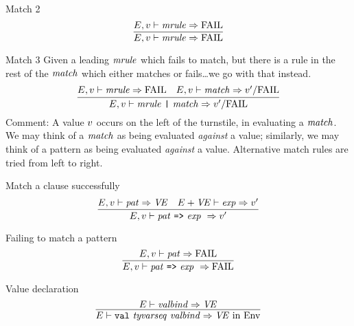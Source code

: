 \begin{inference-rule}{Match 2}
\begin{equation}\label{rule:dynamic-core:match2}
\vcenter{\infer{\E,\V\ts\mrule\ra\FAIL}{\E,\V\ts\mrule\ra\FAIL}}
\end{equation}
\end{inference-rule}

\begin{inference-rule}{Match 3}
Given a leading $\textit{mrule\/}$ which fails to match, but there is a rule in
the rest of the $\textit{match\/}$ which either matches or fails\dots we go with
that instead.
\begin{equation}\label{rule:dynamic-core:match3}
\vcenter{\infer{\E,\V\ts\longmatcha\ra\V'/\FAIL}
  {\E,\V\ts\mrule\ra\FAIL
    & \E,\V\ts\match\ra\V'/\FAIL}}
\end{equation}
Comment: A value $v$ occurs on the left of the turnstile, in evaluating
a $\textit{match\/}$. We may think of a $\textit{match\/}$ as being evaluated \emph{against}
a value; similarly, we may think of a pattern as being evaluated
\emph{against} a value. Alternative match rules are tried from left to
right.
\end{inference-rule}


\begin{inference-rule}{Match a clause successfully}
\begin{equation}\label{rule:dynamic-core:mrule1}
\vcenter{\infer{\E,\V\ts\longmrule\ \ra\V'}
  {\E,\V\ts\pat\ra\VE
    & \E+\VE\ts\exp\ra\V'}}
\end{equation}
\end{inference-rule}

\begin{inference-rule}{Failing to match a pattern}
\begin{equation}\label{rule:dynamic-core:mrule2}
\vcenter{\infer{\E,\V\ts\longmrule\ \ra\FAIL}{\E,\V\ts\pat\ra\FAIL}}
\end{equation}
\end{inference-rule}


\begin{inference-rule}{Value declaration}
\begin{equation}\label{rule:dynamic-core:value-declaration}
\vcenter{\infer{\E\ts\explicitvaldec\ra\VE\ \In\ \Env}
  {\E\ts\valbind\ra\VE}}
\end{equation}
\end{inference-rule}

